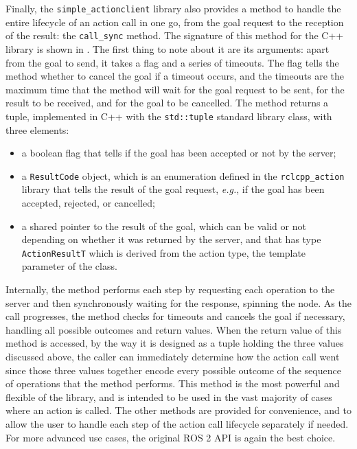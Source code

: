 Finally, the \texttt{simple\_actionclient} library also provides a method to handle the entire lifecycle of an action call in one go, from the goal request to the reception of the result: the \texttt{call\_sync} method. The signature of this method for the C++ library is shown in . The first thing to note about it are its arguments: apart from the goal to send, it takes a flag and a series of timeouts. The flag tells the method whether to cancel the goal if a timeout occurs, and the timeouts are the maximum time that the method will wait for the goal request to be sent, for the result to be received, and for the goal to be cancelled. The method returns a tuple, implemented in C++ with the \texttt{std::tuple} standard library class, with three elements:
\begin{itemize}
  \item a boolean flag that tells if the goal has been accepted or not by the server;
  \item a \texttt{ResultCode} object, which is an enumeration defined in the \texttt{rclcpp\_action} library that tells the result of the goal request, \emph{e.g.}, if the goal has been accepted, rejected, or cancelled;
  \item a shared pointer to the result of the goal, which can be valid or not depending on whether it was returned by the server, and that has type \texttt{ActionResultT} which is derived from the action type, the template parameter of the class.
\end{itemize}
Internally, the method performs each step by requesting each operation to the server and then synchronously waiting for the response, spinning the node. As the call progresses, the method checks for timeouts and cancels the goal if necessary, handling all possible outcomes and return values. When the return value of this method is accessed, by the way it is designed as a tuple holding the three values discussed above, the caller can immediately determine how the action call went since those three values together encode every possible outcome of the sequence of operations that the method performs. This method is the most powerful and flexible of the library, and is intended to be used in the vast majority of cases where an action is called. The other methods are provided for convenience, and to allow the user to handle each step of the action call lifecycle separately if needed. For more advanced use cases, the original ROS 2 API is again the best choice.

